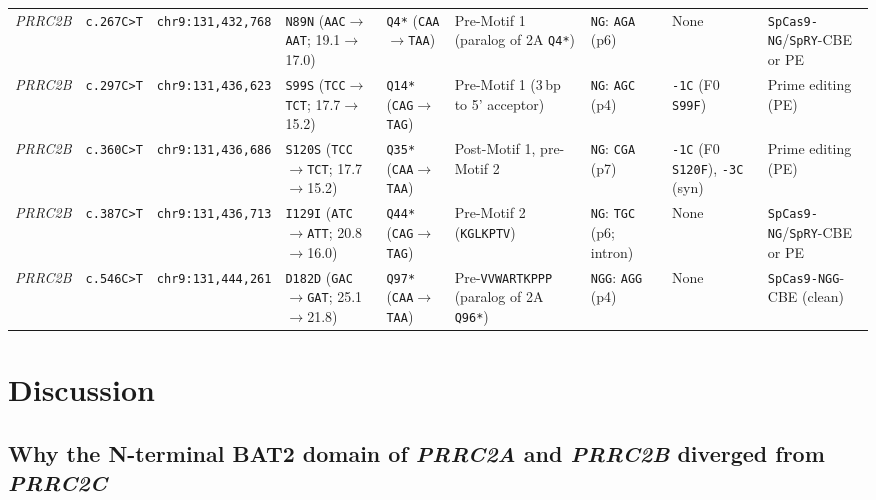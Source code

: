 \documentclass[10pt,letterpaper]{article}
\newcommand{\gene}[1]{\textit{#1}}
\begin{document}
\begin{table}[!htbp]
{\begin{tabular}{@{}lllllllll@{}}
\midrule
\gene{PRRC2B} & \texttt{c.267C>T} & \texttt{chr9:131,432,768} & \texttt{N89N} (\texttt{AAC}$\rightarrow$\texttt{AAT}; 19.1$\rightarrow$17.0) & \texttt{Q4*} (\texttt{CAA}$\rightarrow$\texttt{TAA}) & Pre-Motif 1 (paralog of 2A \texttt{Q4*}) & \texttt{NG}: \texttt{AGA} (p6) & None & \texttt{SpCas9-NG}/\texttt{SpRY}-CBE or PE \\
\gene{PRRC2B} & \texttt{c.297C>T} & \texttt{chr9:131,436,623} & \texttt{S99S} (\texttt{TCC}$\rightarrow$\texttt{TCT}; 17.7$\rightarrow$15.2) & \texttt{Q14*} (\texttt{CAG}$\rightarrow$\texttt{TAG}) & Pre-Motif 1 (3\,bp to 5' acceptor) & \texttt{NG}: \texttt{AGC} (p4) & \texttt{-1C} (F0 \texttt{S99F}) & Prime editing (PE) \\
\gene{PRRC2B} & \texttt{c.360C>T} & \texttt{chr9:131,436,686} & \texttt{S120S} (\texttt{TCC}$\rightarrow$\texttt{TCT}; 17.7$\rightarrow$15.2) & \texttt{Q35*} (\texttt{CAA}$\rightarrow$\texttt{TAA}) & Post-Motif 1, pre-Motif 2 & \texttt{NG}: \texttt{CGA} (p7) & \texttt{-1C} (F0 \texttt{S120F}), \texttt{-3C} (syn) & Prime editing (PE) \\
\gene{PRRC2B} & \texttt{c.387C>T} & \texttt{chr9:131,436,713} & \texttt{I129I} (\texttt{ATC}$\rightarrow$\texttt{ATT}; 20.8$\rightarrow$16.0) & \texttt{Q44*} (\texttt{CAG}$\rightarrow$\texttt{TAG}) & Pre-Motif 2 (\texttt{KGLKPTV}) & \texttt{NG}: \texttt{TGC} (p6; intron) & None & \texttt{SpCas9-NG}/\texttt{SpRY}-CBE or PE \\
\gene{PRRC2B} & \texttt{c.546C>T} & \texttt{chr9:131,444,261} & \texttt{D182D} (\texttt{GAC}$\rightarrow$\texttt{GAT}; 25.1$\rightarrow$21.8) & \texttt{Q97*} (\texttt{CAA}$\rightarrow$\texttt{TAA}) & Pre-\texttt{VVWARTKPPP} (paralog of 2A \texttt{Q96*}) & \texttt{NGG}: \texttt{AGG} (p4) & None & \texttt{SpCas9-NGG}-CBE (clean) \\
\bottomrule
\end{tabular}}
\end{table}

\section{Discussion}

\subsection{Why the N-terminal BAT2 domain of \gene{PRRC2A} and \gene{PRRC2B} diverged from \gene{PRRC2C}}
\end{document}
